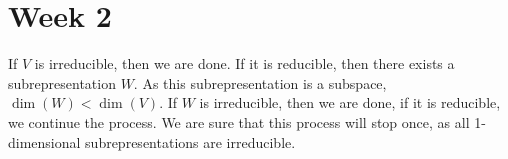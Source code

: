 \section*{Week 2}


If $V$ is irreducible, then we are done. If it is reducible, then there exists a subrepresentation $W$. As this subrepresentation is a subspace, $\dim(W) < \dim (V)$. If $W$ is irreducible, then we are done, if it is reducible, we continue the process. We are sure that this process will stop once, as all 1-dimensional subrepresentations are irreducible.

